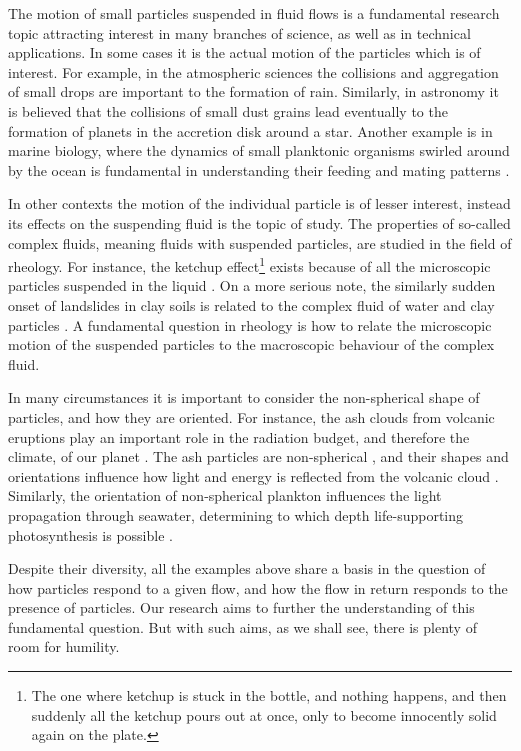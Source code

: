 \documentclass[thesis.tex]{subfiles}
\begin{document}
The motion of small particles suspended in fluid flows is a fundamental research topic attracting interest in many branches of science, as well as in technical applications. In some cases it is the actual motion of the particles which is of interest. For example, in the atmospheric sciences the collisions and aggregation of small drops are important to the formation of rain. Similarly, in astronomy it is believed that the collisions of small dust grains lead eventually to the formation of planets in the accretion disk around a star. Another example is in marine biology, where the dynamics of small planktonic organisms swirled around by the ocean is fundamental in understanding their feeding and mating patterns \cite{guasto2012}. 

In other contexts the motion of the individual particle is of lesser interest, instead its effects on the suspending fluid is the topic of study. The properties of so-called complex fluids, meaning fluids with suspended particles, are studied in the field of rheology. For instance, the ketchup effect\footnote{The one where ketchup is stuck in the bottle, and nothing happens, and then suddenly all the ketchup pours out at once, only to become innocently solid again on the plate.} exists because of all the microscopic particles suspended in the liquid \cite{bayod2008}. On a more serious note, the similarly sudden onset of landslides in clay soils is related to the complex fluid of water and clay particles \cite{coussot2002}. A fundamental question in rheology is how to relate the microscopic motion of the suspended particles to the macroscopic behaviour of the complex fluid.

In many circumstances it is important to consider the non-spherical shape of particles, and how they are oriented. For instance, the ash clouds from volcanic eruptions play an important role in the radiation budget, and therefore the climate, of our planet \cite{mather2003}. The ash particles are non-spherical \cite{gasteiger2011}, and their shapes and orientations influence how light and energy is reflected from the volcanic cloud \cite{dubovik2002}. Similarly, the orientation of non-spherical plankton influences the light propagation through seawater, determining to which depth life-supporting photosynthesis is possible \cite{marcos2011}. 

Despite their diversity, all the examples above share a basis in the question of how particles respond to a given flow, and how the flow in return responds to the presence of particles. Our research aims to further the understanding of this fundamental question. But with such aims, as we shall see, there is plenty of room for humility.
\end{document}
